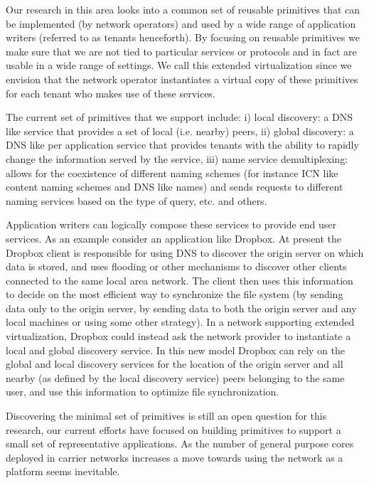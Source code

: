 \documentclass[letterpaper]{article}
\begin{document}
Our research in this area looks into a common set of reusable primitives that can be implemented (by network
operators) and used by a wide range of application writers (referred to as tenants henceforth). By focusing
on reusable primitives we make sure that we are not tied to particular services or protocols and in fact are
usable in a wide range of settings. We call this extended virtualization since we envision that the network
operator instantiates a virtual copy of these primitives for each tenant who makes use of these services.

The current set of primitives that we support include: i) local discovery: a DNS like service that provides a
set of local (i.e. nearby) peers, ii) global discovery: a DNS like per application service that provides
tenants with the ability to rapidly change the information served by the service, iii) name service
demultiplexing: allows for the coexistence of different naming schemes (for instance ICN like content naming
schemes and DNS like names) and sends requests to different naming services based on the type of query, etc.
and others.

Application writers can logically compose these services to provide end user services. As an example consider
an application like Dropbox. At present the Dropbox client is responsible for using DNS to discover the
origin server on which data is stored, and uses flooding or other mechanisms to discover other clients connected to
the same local area network. The client then uses this information to decide on the most efficient way to
synchronize the file system (by sending data only to the origin server, by sending data to both the origin
server and any local machines or using some other strategy). In a network supporting extended virtualization,
Dropbox could instead ask the network provider to instantiate a local and global discovery service. In this
new model Dropbox can rely on the global and local discovery services for the location of the origin server and
all nearby (as defined by the local discovery service) peers belonging to the same user, and use this
information to optimize file synchronization.

Discovering the minimal set of primitives is still an open question for this research, our current efforts
have focused on building primitives to support a small set of representative applications. As the number of
general purpose cores deployed in carrier networks increases a move towards using the network as a platform
seems inevitable.
\end{document}
